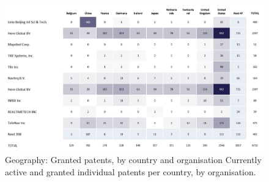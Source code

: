 \begin{figure}[h]
    \centering
    \includegraphics[width=\textwidth]{img/patents/Geography Granted patents by country and organisation.png}
    \caption{Geography: Granted patents, by country and organisation
Currently active and granted individual patents per country, by organisation.}
    \label{fig:Granted-patents-by-coutry}
\end{figure}



\begin{table}[]
\caption{Portfolio size: Active patent families, by organization and technology}
\label{tab:patents-scope}
\end{table}



